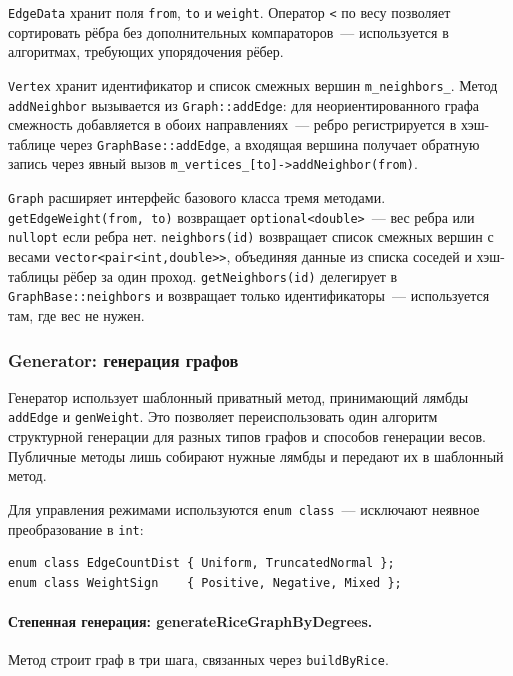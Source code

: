 \texttt{EdgeData} хранит поля \texttt{from}, \texttt{to} и \texttt{weight}.
Оператор \texttt{<} по весу позволяет сортировать рёбра без дополнительных
компараторов~--- используется в алгоритмах, требующих упорядочения рёбер.

\texttt{Vertex} хранит идентификатор и список смежных вершин
\texttt{m\_neighbors\_}. Метод \texttt{addNeighbor} вызывается из
\texttt{Graph::addEdge}: для неориентированного графа смежность
добавляется в обоих направлениях~--- ребро регистрируется в хэш-таблице
через \texttt{GraphBase::addEdge}, а входящая вершина получает обратную
запись через явный вызов \texttt{m\_vertices\_[to]->addNeighbor(from)}.

\texttt{Graph} расширяет интерфейс базового класса тремя методами. \\
\texttt{getEdgeWeight(from, to)} возвращает \texttt{optional<double>}~---
вес ребра или \texttt{nullopt} если ребра нет.
\texttt{neighbors(id)} возвращает список смежных вершин с весами
\texttt{vector<pair<int,double>>}, объединяя данные из списка соседей
и хэш-таблицы рёбер за один проход.
\texttt{getNeighbors(id)} делегирует в  \\ \texttt{GraphBase::neighbors}
и возвращает только идентификаторы~--- используется там, где вес не нужен.

\subsubsection{Generator: генерация графов}

Генератор использует шаблонный приватный метод,
принимающий лямбды \texttt{addEdge} и \texttt{genWeight}. Это позволяет
переиспользовать один алгоритм структурной генерации для разных типов
графов и способов генерации весов. Публичные методы лишь собирают
нужные лямбды и передают их в шаблонный метод.

Для управления режимами используются \texttt{enum class}~--- исключают
неявное преобразование в \texttt{int}:

\begin{lstlisting}[style=cppstyle, caption={Перечисления параметров генератора (Generator.h)}]
enum class EdgeCountDist { Uniform, TruncatedNormal };
enum class WeightSign    { Positive, Negative, Mixed };
\end{lstlisting}

\paragraph{Степенная генерация: generateRiceGraphByDegrees.}
Метод строит граф в три шага, связанных через \texttt{buildByRice}.


